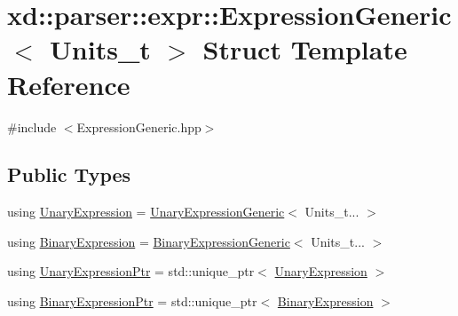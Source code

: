 \hypertarget{structxd_1_1parser_1_1expr_1_1_expression_generic}{}\section{xd\+:\+:parser\+:\+:expr\+:\+:Expression\+Generic$<$ Units\+\_\+t $>$ Struct Template Reference}
\label{structxd_1_1parser_1_1expr_1_1_expression_generic}


{\ttfamily \#include $<$Expression\+Generic.\+hpp$>$}

\subsection*{Public Types}
\begin{DoxyCompactItemize}
\item 
using \mbox{\hyperlink{structxd_1_1parser_1_1expr_1_1_expression_generic_a8cca2ad1a4cf5a6e05d9bcc1c440c184}{Unary\+Expression}} = \mbox{\hyperlink{structxd_1_1parser_1_1expr_1_1_unary_expression_generic}{Unary\+Expression\+Generic}}$<$ Units\+\_\+t... $>$
\item 
using \mbox{\hyperlink{structxd_1_1parser_1_1expr_1_1_expression_generic_a2bc00be3a5e572a1bee429bcda5943d8}{Binary\+Expression}} = \mbox{\hyperlink{structxd_1_1parser_1_1expr_1_1_binary_expression_generic}{Binary\+Expression\+Generic}}$<$ Units\+\_\+t... $>$
\item 
using \mbox{\hyperlink{structxd_1_1parser_1_1expr_1_1_expression_generic_ae516fdc68d9578b128200311c23e7feb}{Unary\+Expression\+Ptr}} = std\+::unique\+\_\+ptr$<$ \mbox{\hyperlink{structxd_1_1parser_1_1expr_1_1_expression_generic_a8cca2ad1a4cf5a6e05d9bcc1c440c184}{Unary\+Expression}} $>$
\item 
using \mbox{\hyperlink{structxd_1_1parser_1_1expr_1_1_expression_generic_af3290b56362f6bc7ca516b947905c42c}{Binary\+Expression\+Ptr}} = std\+::unique\+\_\+ptr$<$ \mbox{\hyperlink{structxd_1_1parser_1_1expr_1_1_expression_generic_a2bc00be3a5e572a1bee429bcda5943d8}{Binary\+Expression}} $>$
\end{DoxyCompactItemize}
